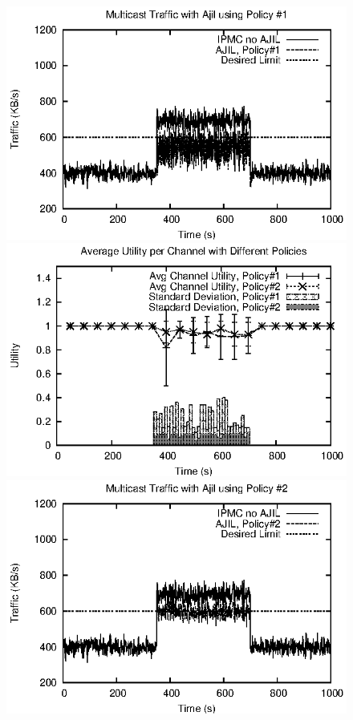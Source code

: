 \begin{figure}[t]
 \centering
 \includegraphics{figures/evaluation/policy/ajil-policy1.eps}
 \includegraphics{figures/evaluation/policy/channels-utility.eps}
 \includegraphics{figures/evaluation/policy/ajil-policy2.eps}

\end{figure}

